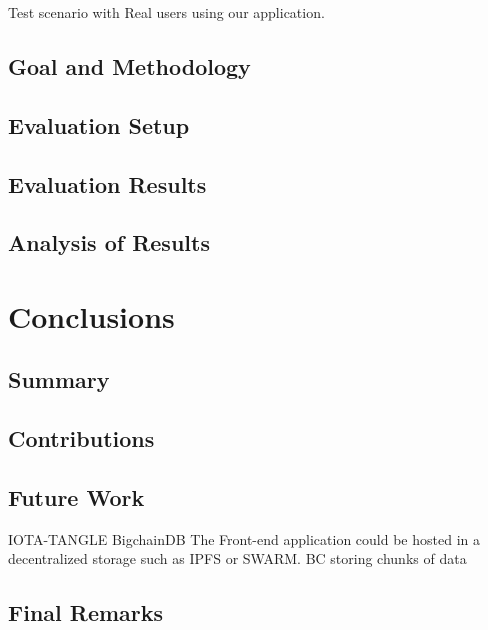 Test scenario with Real users using our application.

\section{Goal and Methodology}

\section{Evaluation Setup}

\section{Evaluation Results}

\section{Analysis of Results}


\chapter{Conclusions}
\label{ch:closure}


\section{Summary}

\section{Contributions}

\section{Future Work}

IOTA-TANGLE
BigchainDB
The Front-end application could be hosted in a decentralized storage such as IPFS or SWARM.
BC storing chunks of data

\section{Final Remarks}
